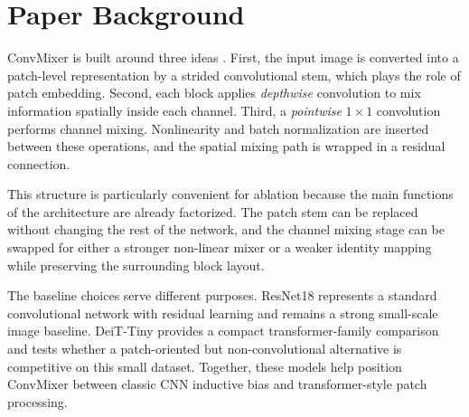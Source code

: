 \section{Paper Background}

ConvMixer is built around three ideas \citep{trockman2022patches}. First, the input image is converted into a patch-level representation by a strided convolutional stem, which plays the role of patch embedding. Second, each block applies \emph{depthwise} convolution to mix information spatially inside each channel. Third, a \emph{pointwise} $1 \times 1$ convolution performs channel mixing. Nonlinearity and batch normalization are inserted between these operations, and the spatial mixing path is wrapped in a residual connection.

This structure is particularly convenient for ablation because the main functions of the architecture are already factorized. The patch stem can be replaced without changing the rest of the network, and the channel mixing stage can be swapped for either a stronger non-linear mixer or a weaker identity mapping while preserving the surrounding block layout.

The baseline choices serve different purposes. ResNet18 \citep{he2016deep} represents a standard convolutional network with residual learning and remains a strong small-scale image baseline. DeiT-Tiny \citep{touvron2021training} provides a compact transformer-family comparison and tests whether a patch-oriented but non-convolutional alternative is competitive on this small dataset. Together, these models help position ConvMixer between classic CNN inductive bias and transformer-style patch processing.
